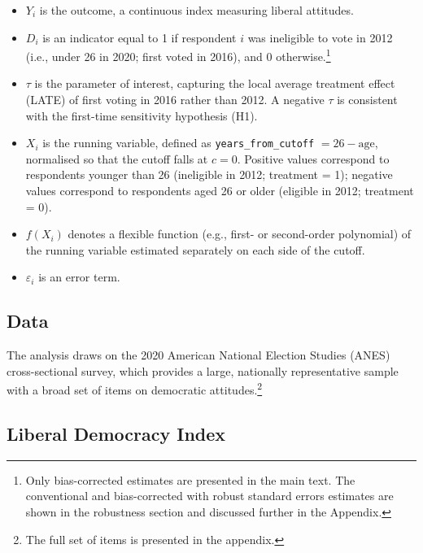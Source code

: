 \documentclass[
  10pt,
  letterpaper,
  DIV=11,
  numbers=noendperiod]{scrartcl}
\providecommand{\tightlist}{%
  \setlength{\itemsep}{0pt}\setlength{\parskip}{0pt}}
\begin{document}
\begin{itemize}
\tightlist
\item
  \(Y_i\) is the outcome, a continuous index measuring liberal
  attitudes.
\item
  \(D_i\) is an indicator equal to 1 if respondent \(i\) was ineligible
  to vote in 2012 (i.e., under 26 in 2020; first voted in 2016), and 0
  otherwise.\footnote{Only bias-corrected estimates are presented in the
    main text. The conventional and bias-corrected with robust standard
    errors estimates are shown in the robustness section and discussed
    further in the Appendix.}
\item
  \(\tau\) is the parameter of interest, capturing the local average
  treatment effect (LATE) of first voting in 2016 rather than 2012. A
  negative \(\tau\) is consistent with the first-time sensitivity
  hypothesis (H1).
\item
  \(X_i\) is the running variable, defined as
  \texttt{years\_from\_cutoff} \(= 26 - \text{age}\), normalised so that
  the cutoff falls at \(c = 0\). Positive values correspond to
  respondents younger than 26 (ineligible in 2012; treatment = 1);
  negative values correspond to respondents aged 26 or older (eligible
  in 2012; treatment = 0).
\item
  \(f(X_i)\) denotes a flexible function (e.g., first- or second-order
  polynomial) of the running variable estimated separately on each side
  of the cutoff.
\item
  \(\varepsilon_i\) is an error term.
\end{itemize}

\subsection{Data}\label{data}

The analysis draws on the 2020 American National Election Studies (ANES)
cross-sectional survey, which provides a large, nationally
representative sample with a broad set of items on democratic
attitudes.\footnote{The full set of items is presented in the appendix.}

\subsection{Liberal Democracy Index}\label{liberal-democracy-index}
\end{document}
